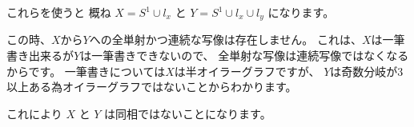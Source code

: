 \documentclass[12pt,b5paper]{ltjsarticle}
\begin{document}
\begin{enumerate}
       これらを使うと 概ね
       $X= S^1 \cup l_x$ と $Y= S^1 \cup l_x \cup l_y$
       になります。

       この時、$X$から$Y$への全単射かつ連続な写像は存在しません。
       これは、$X$は一筆書き出来るが$Y$は一筆書きできないので、
       全単射な写像は連続写像ではなくなるからです。
       一筆書きについては$X$は半オイラーグラフですが、
       $Y$は奇数分岐が3以上ある為オイラーグラフではないことからわかります。

       これにより $X$ と $Y$ は同相ではないことになります。

\end{enumerate}
\end{document}
